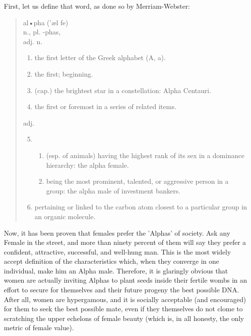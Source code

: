 First, let us define that word, as done so by Merriam-Webster:
\begin{quote}
 al•pha ('æl fe)
\\
 n., pl. -phas,\\
 adj. n.
\begin{enumerate}
       \item the first letter of the Greek alphabet (A, a).
       \item the first; beginning.
       \item (cap.) the brightest star in a constellation: Alpha Centauri.
       \item the first or foremost in a series of related items. 
\end{enumerate}
 adj.
\begin{enumerate}
\setcounter{enumi}{4}
       \item \begin{enumerate}
          \item  (esp. of animals) having the highest rank of its sex in a dominance hierarchy: the alpha female.
          \item  being the most prominent, talented, or aggressive person in a group: the alpha male of investment bankers.
       \end{enumerate}
       \item pertaining or linked to the carbon atom closest to a particular group in an organic molecule. 
\end{enumerate}
\end{quote}

Now, it has been proven that females prefer the 'Alphas' of society. Ask any Female in the street, and more than 
ninety percent of them will say they prefer a confident, attractive, successful, and well-hung man. This is the most 
widely accept definition of the characteristics which, when they converge in one individual, make him an Alpha male.
Therefore, it is glaringly obvious that women are actually inviting Alphas to plant seeds inside their fertile wombs 
in an effort to secure for themselves and their future progeny the best possible DNA. After all, women are hypergamous, 
and it is socially acceptable (and encouraged) for them to seek the best possible mate, even if they themselves do not 
clome to scratching the upper echelons of female beauty (which is, in all honesty, the only metric of female value).

